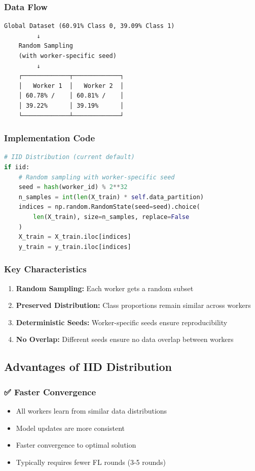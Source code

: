 \documentclass[12pt,a4paper]{article}
\begin{document}
\subsubsection{Data Flow}

\begin{verbatim}
Global Dataset (60.91% Class 0, 39.09% Class 1)
         ↓
    Random Sampling
    (with worker-specific seed)
         ↓
    ┌─────────────┬─────────────┐
    │   Worker 1  │   Worker 2  │
    │ 60.78% /    │ 60.81% /    │
    │ 39.22%      │ 39.19%      │
    └─────────────┴─────────────┘
\end{verbatim}

\subsubsection{Implementation Code}

\begin{lstlisting}[language=Python]
# IID Distribution (current default)
if iid:
    # Random sampling with worker-specific seed
    seed = hash(worker_id) % 2**32
    n_samples = int(len(X_train) * self.data_partition)
    indices = np.random.RandomState(seed=seed).choice(
        len(X_train), size=n_samples, replace=False
    )
    X_train = X_train.iloc[indices]
    y_train = y_train.iloc[indices]
\end{lstlisting}

\subsubsection{Key Characteristics}

\begin{enumerate}
    \item \textbf{Random Sampling:} Each worker gets a random subset
    \item \textbf{Preserved Distribution:} Class proportions remain similar across workers
    \item \textbf{Deterministic Seeds:} Worker-specific seeds ensure reproducibility
    \item \textbf{No Overlap:} Different seeds ensure no data overlap between workers
\end{enumerate}

\subsection{Advantages of IID Distribution}

\subsubsection{✅ Faster Convergence}
\begin{itemize}
    \item All workers learn from similar data distributions
    \item Model updates are more consistent
    \item Faster convergence to optimal solution
    \item Typically requires fewer FL rounds (3-5 rounds)
\end{itemize}
\end{document}
